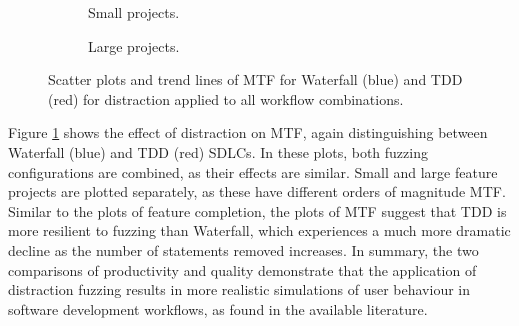 \documentclass{llncs}
\begin{document}
\begin{figure}[t]
  \centering
  \hfill
  \begin{subfigure}{2.3in}
    \caption{Small projects.}
  \end{subfigure}
  \hfill
  \begin{subfigure}{2.3in}
    \caption{Large projects.}  
  \end{subfigure}
  \hfill

  \caption{Scatter plots and trend lines of MTF for Waterfall (blue) and TDD (red) for distraction applied to all
    workflow combinations.}

  \label{fig:fuzzing-mtf}
\end{figure}

Figure \ref{fig:fuzzing-mtf} shows the effect of distraction on MTF, again distinguishing between Waterfall (blue) and
TDD (red) SDLCs.  In these plots, both fuzzing configurations are combined, as their effects are similar.  Small and
large feature projects are plotted separately, as these have different orders of magnitude MTF.  Similar to the plots
of feature completion, the plots of MTF suggest that TDD is more resilient to fuzzing than Waterfall, which experiences
a much more dramatic decline as the number of statements removed increases.  In summary, the two comparisons of
productivity and quality demonstrate that the application of distraction fuzzing results in more realistic simulations
of user behaviour in software development workflows, as found in the available literature.
 
\end{document}
